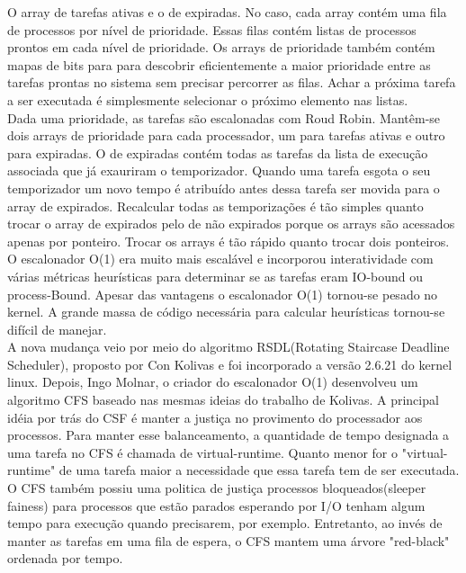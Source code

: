 \documentclass[conference]{IEEEtran}
\begin{document}
 O array de tarefas ativas e o de expiradas. No caso, cada array contém uma fila de processos por nível de prioridade. Essas filas contém listas de processos prontos em cada nível de prioridade. Os  arrays de prioridade também contém mapas de bits para para descobrir eficientemente a maior prioridade entre as tarefas prontas no sistema sem precisar percorrer as filas. Achar a próxima tarefa a ser executada é simplesmente selecionar o próximo elemento nas listas.\\

 Dada uma prioridade, as tarefas são escalonadas com Roud Robin. Mantêm-se dois arrays de prioridade para cada processador, um para tarefas ativas e outro para expiradas. O de expiradas contém todas as tarefas da lista de execução associada que já exauriram o temporizador. Quando uma tarefa esgota o seu temporizador um novo tempo é atribuído antes dessa tarefa ser movida para o array de expirados. Recalcular todas as temporizações é tão simples quanto trocar o array de expirados pelo de não expirados porque os arrays são acessados apenas por ponteiro. Trocar os arrays é tão rápido quanto trocar dois ponteiros\cite{LinuxSchedulerMIT}.\\

 O escalonador O(1) era muito mais escalável e incorporou interatividade com várias métricas heurísticas para determinar se as tarefas eram IO-bound ou process-Bound. Apesar das vantagens o escalonador O(1) tornou-se pesado no kernel. A grande massa de código necessária para calcular heurísticas tornou-se difícil de manejar.\\

 A nova mudança veio por meio do algoritmo RSDL(Rotating Staircase Deadline Scheduler), proposto por Con Kolivas e foi incorporado a versão 2.6.21 do kernel linux. Depois, Ingo Molnar, o criador do escalonador O(1) desenvolveu um algoritmo CFS baseado nas mesmas ideias do trabalho de Kolivas. A principal idéia por trás do CSF é manter a justiça no provimento do processador aos processos. Para manter esse balanceamento, a quantidade de tempo designada a uma tarefa no CFS é chamada de virtual-runtime. Quanto menor for o "virtual-runtime" de uma tarefa maior a necessidade que essa tarefa tem de ser executada.\\
 
O CFS também possiu uma politica de justiça processos bloqueados(sleeper fainess) para processos que estão parados esperando por I/O tenham algum tempo para execução quando precisarem, por exemplo. Entretanto, ao invés de manter as tarefas em uma fila de espera, o CFS mantem uma árvore "red-black" ordenada por tempo.\\
\end{document}
